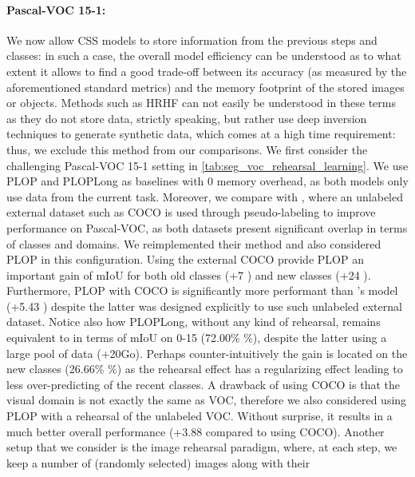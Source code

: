 \paragraph{Pascal-VOC 15-1:} We now allow \ac{CSS} models to store information from the previous
steps and classes: in such a case, the overall model efficiency can be understood as to what extent
it allows to find a good trade-off between its accuracy (as measured by the aforementioned standard
metrics) and the memory footprint of the stored images or objects. Methods such as HRHF
\citep{huang2021halfrealhalffake} can not easily be understood in these terms as they do not store
data, strictly speaking, but rather use deep inversion \citep{yin20deepinversion} techniques to
generate synthetic data, which comes at a high time requirement: thus, we exclude this method from
our comparisons. We first consider the challenging Pascal-VOC 15-1 setting in
\autoref{tab:seg_voc_rehearsal_learning}. We use PLOP and PLOPLong as baselines with 0 memory
overhead, as both models only use data from the current task. Moreover, we compare with
\cite{yu2020continualsegmentationselftraining}, where an unlabeled external dataset such as COCO
\citep{lin2014mscocodataset} is used through pseudo-labeling to improve performance on Pascal-VOC,
as both datasets present significant overlap in terms of classes and domains. We reimplemented their
method and also considered PLOP in this configuration. Using the external COCO provide PLOP an
important gain of \ac{mIoU} for both old classes (+7 \pp) and new classes (+24
\pp). Furthermore, PLOP with COCO is significantly more performant than \cite{yu2020continualsegmentationselftraining}'s model
(+5.43 \pp) despite the latter was designed explicitly to use such unlabeled external
dataset. Notice also how PLOPLong, without any kind of rehearsal, remains equivalent to
\cite{yu2020continualsegmentationselftraining} in terms of \ac{mIoU} on 0-15 (72.00\% \%),
despite the latter using a large pool of data (+20Go). Perhaps counter-intuitively the gain is
located on the new classes (26.66\% \%) as the rehearsal effect has a regularizing effect
leading to less over-predicting of the recent classes. A drawback of using COCO is that the visual
domain is not exactly the same as VOC, therefore we also considered using PLOP with a rehearsal of
the unlabeled VOC. Without surprise, it results in a much better overall performance (+3.88
\pp compared to using COCO). Another setup that we consider is the image rehearsal
paradigm, where, at each step, we keep a number of (randomly selected) images along with their
